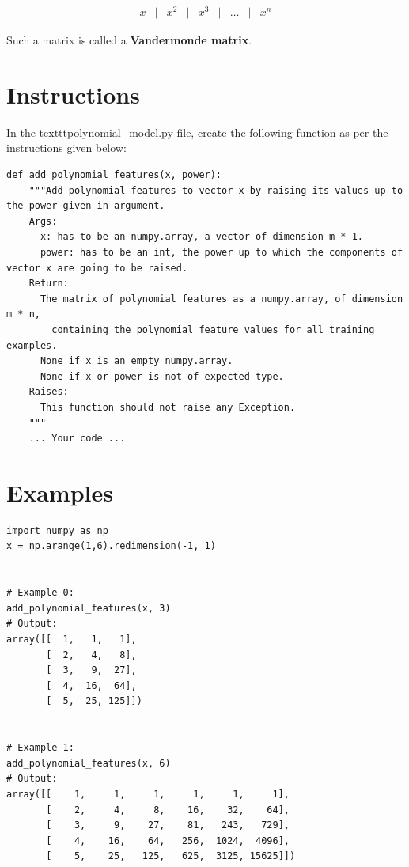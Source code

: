 \documentclass{42-en}
\begin{document}
$$
\begin{matrix}
x &|& x^2 &|& x^3 &|& \ldots &|& x^n
\end{matrix}
$$

Such a matrix is called a \textbf{Vandermonde matrix}.

\section*{Instructions}
In the texttt{polynomial\_model.py} file, create the following function as per the instructions given below:

\begin{verbatim}
def add_polynomial_features(x, power):
    """Add polynomial features to vector x by raising its values up to the power given in argument.  
    Args:
      x: has to be an numpy.array, a vector of dimension m * 1.
      power: has to be an int, the power up to which the components of vector x are going to be raised.
    Return:
      The matrix of polynomial features as a numpy.array, of dimension m * n,
        containing the polynomial feature values for all training examples.
      None if x is an empty numpy.array.
      None if x or power is not of expected type.
    Raises:
      This function should not raise any Exception.
    """
    ... Your code ...
\end{verbatim}

\section*{Examples}
\begin{verbatim}
import numpy as np
x = np.arange(1,6).redimension(-1, 1)


# Example 0:
add_polynomial_features(x, 3)
# Output:
array([[  1,   1,   1],
       [  2,   4,   8],
       [  3,   9,  27],
       [  4,  16,  64],
       [  5,  25, 125]])


# Example 1:
add_polynomial_features(x, 6)
# Output:
array([[    1,     1,     1,     1,     1,     1],
       [    2,     4,     8,    16,    32,    64],
       [    3,     9,    27,    81,   243,   729],
       [    4,    16,    64,   256,  1024,  4096],
       [    5,    25,   125,   625,  3125, 15625]])
\end{verbatim}
\end{document}
